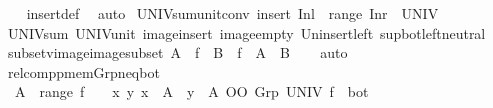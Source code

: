 \begin{isabellebody}
%
\isadelimproof
\ \ %
\endisadelimproof
%
\isatagproof
{}\isamarkupfalse%
\ insert{\isacharunderscore}{\kern0pt}def\ \isamarkupfalse%
\ auto%
\endisatagproof
{\isafoldproof}%
%
\isadelimproof
\isanewline
%
\endisadelimproof
\isanewline
{}\isamarkupfalse%
\ UNIV{\isacharunderscore}{\kern0pt}sum{\isacharunderscore}{\kern0pt}unit{\isacharunderscore}{\kern0pt}conv{\isacharcolon}{\kern0pt}\ {\isachardoublequoteopen}insert\ {\isacharparenleft}{\kern0pt}Inl\ {\isacharparenleft}{\kern0pt}{\isacharparenright}{\kern0pt}{\isacharparenright}{\kern0pt}\ {\isacharparenleft}{\kern0pt}range\ Inr{\isacharparenright}{\kern0pt}\ {\isacharequal}{\kern0pt}\ UNIV{\isachardoublequoteclose}\isanewline
%
\isadelimproof
\ \ %
\endisadelimproof
%
\isatagproof
{}\isamarkupfalse%
\ UNIV{\isacharunderscore}{\kern0pt}sum\ UNIV{\isacharunderscore}{\kern0pt}unit\ image{\isacharunderscore}{\kern0pt}insert\ image{\isacharunderscore}{\kern0pt}empty\ Un{\isacharunderscore}{\kern0pt}insert{\isacharunderscore}{\kern0pt}left\ sup{\isacharunderscore}{\kern0pt}bot{\isachardot}{\kern0pt}left{\isacharunderscore}{\kern0pt}neutral\isacommand{{\isachardot}{\kern0pt}{\isachardot}{\kern0pt}}\isamarkupfalse%
%
\endisatagproof
{\isafoldproof}%
%
\isadelimproof
\isanewline
%
\endisadelimproof
\isanewline
{}\isamarkupfalse%
\ subset{\isacharunderscore}{\kern0pt}vimage{\isacharunderscore}{\kern0pt}image{\isacharunderscore}{\kern0pt}subset{\isacharcolon}{\kern0pt}\ {\isachardoublequoteopen}A\ {\isasymsubseteq}\ f\ {\isacharminus}{\kern0pt}{\isacharbackquote}{\kern0pt}\ B\ {\isasymLongrightarrow}\ f\ {\isacharbackquote}{\kern0pt}\ A\ {\isasymsubseteq}\ B{\isachardoublequoteclose}\isanewline
%
\isadelimproof
\ \ %
\endisadelimproof
%
\isatagproof
{}\isamarkupfalse%
\ auto%
\endisatagproof
{\isafoldproof}%
%
\isadelimproof
\isanewline
%
\endisadelimproof
\isanewline
{}\isamarkupfalse%
\ relcompp{\isacharunderscore}{\kern0pt}mem{\isacharunderscore}{\kern0pt}Grp{\isacharunderscore}{\kern0pt}neq{\isacharunderscore}{\kern0pt}bot{\isacharcolon}{\kern0pt}\isanewline
\ \ {\isachardoublequoteopen}A\ {\isasyminter}\ range\ f\ {\isasymnoteq}\ {\isacharbraceleft}{\kern0pt}{\isacharbraceright}{\kern0pt}\ {\isasymLongrightarrow}\ {\isacharparenleft}{\kern0pt}{\isasymlambda}x\ y{\isachardot}{\kern0pt}\ x\ {\isasymin}\ A\ {\isasymand}\ y\ {\isasymin}\ A{\isacharparenright}{\kern0pt}\ OO\ {\isacharparenleft}{\kern0pt}Grp\ UNIV\ f{\isacharparenright}{\kern0pt}{\isasyminverse}{\isasyminverse}\ {\isasymnoteq}\ bot{\isachardoublequoteclose}\isanewline

\end{isabellebody}
